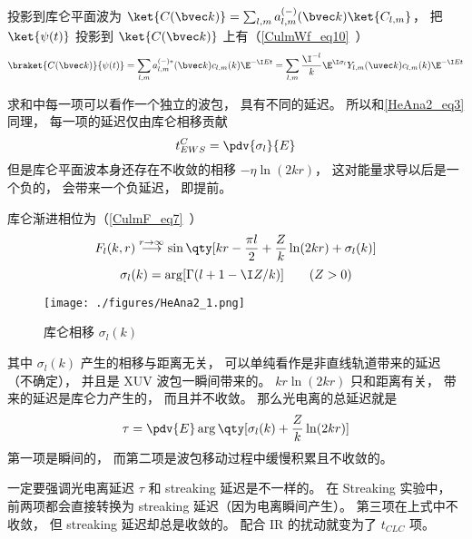 投影到库仑平面波为 $\ket{C(\bvec k)} = \sum_{l,m} a_{l,m}^{(-)}(\bvec k) \ket{C_{l,m}}$， 把 $\ket{\psi(t)}$ 投影到 $\ket{C(\bvec k)}$ 上有（\autoref{CulmWf_eq10}~）
\begin{equation}
\braket{C(\bvec k)}{\psi(t)} = \sum_{l,m} a_{l,m}^{(-)*}(\bvec k) c_{l,m}(k) \E^{-\I E t} 
= \sum_{l,m} \frac{\I^{-l}}{k} \E^{\I\sigma_l} Y_{l,m} (\uvec k) c_{l,m}(k) \E^{-\I E t}
\end{equation}

求和中每一项可以看作一个独立的波包， 具有不同的延迟。 所以和\autoref{HeAna2_eq3} 同理， 每一项的延迟仅由库仑相移贡献
\begin{equation}
t_{EWS}^C = \pdv{\sigma_l}{E}
\end{equation}
但是库仑平面波本身还存在不收敛的相移 $-\eta\ln (2kr)$， 这对能量求导以后是一个负的， 会带来一个负延迟， 即提前。

库仑渐进相位为（\autoref{CulmF_eq7}~）
\begin{equation}
F_l(k, r) \overset{r\to \infty}{\longrightarrow} \sin\qty[kr - \frac{\pi l}{2} + \frac{Z}{k}\ln(2kr) + \sigma_l(k)] %
\end{equation}
\begin{equation}
\sigma_l(k) = \arg[\Gamma(l+1-\I Z/k)] \qquad (Z > 0)
\end{equation}
\begin{figure}[ht]
\centering
\texttt{[image: ./figures/HeAna2\_1.png]}
\caption{库仑相移 $\sigma_l(k)$} \label{HeAna2_fig1}
\end{figure}
其中 $\sigma_l(k)$ 产生的相移与距离无关， 可以单纯看作是非直线轨道带来的延迟（不确定）， 并且是 XUV 波包一瞬间带来的。 $kr\ln(2kr)$ 只和距离有关， 带来的延迟是库仑力产生的， 而且并不收敛。 那么光电离的总延迟就是
\begin{equation}\label{HeAna2_eq5}
\tau = \pdv{E} \arg\qty[\sigma_l(k) + \frac{Z}{k}\ln(2kr)] %
\end{equation}
第一项是瞬间的， 而第二项是波包移动过程中缓慢积累且不收敛的。

一定要强调光电离延迟 $\tau$ 和 streaking 延迟是不一样的。 在 Streaking 实验中， 前两项都会直接转换为 streaking 延迟（因为电离瞬间产生）。 第三项在上式中不收敛， 但 streaking 延迟却总是收敛的。 配合 IR 的扰动就变为了 $t_{CLC}$ 项。

